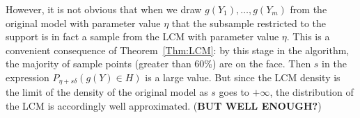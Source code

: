 However, it is not obvious that when we draw $g(Y_1), \ldots, g(Y_m)$ from the 
original model with parameter value $\eta$ that the subsample restricted to the 
support is in fact a sample from the LCM with parameter value $\eta$.  This is a 
convenient consequence of Theorem~\ref{Thm:LCM}: by this stage in the algorithm, the 
majority of sample points (greater than 60\%) are on the face.  Then $s$ in the 
expression $P_{\eta + s \delta}(g(Y) \in H)$ is a large value.  But since the LCM 
density is the limit of the density of the original model as $s$ goes to $+\infty$, 
the distribution of the LCM is accordingly well approximated.  (\textbf{BUT WELL 
ENOUGH?})
